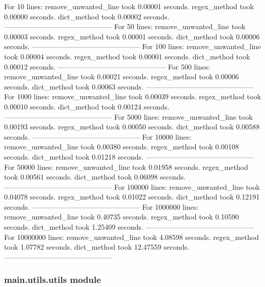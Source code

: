 \documentclass[letterpaper,10pt,english]{sphinxmanual}
\begin{document}
\begin{fulllineitems}
\pysigstopsignatures
\sphinxAtStartPar
For 10 lines:
remove\_unwanted\_line took 0.00001 seconds.
regex\_method took 0.00000 seconds.
dict\_method took 0.00002 seconds.
———————————————
For 50 lines:
remove\_unwanted\_line took 0.00003 seconds.
regex\_method took 0.00001 seconds.
dict\_method took 0.00006 seconds.
———————————————
For 100 lines:
remove\_unwanted\_line took 0.00004 seconds.
regex\_method took 0.00001 seconds.
dict\_method took 0.00012 seconds.
———————————————
For 500 lines:
remove\_unwanted\_line took 0.00021 seconds.
regex\_method took 0.00006 seconds.
dict\_method took 0.00063 seconds.
———————————————
For 1000 lines:
remove\_unwanted\_line took 0.00039 seconds.
regex\_method took 0.00010 seconds.
dict\_method took 0.00124 seconds.
———————————————
For 5000 lines:
remove\_unwanted\_line took 0.00193 seconds.
regex\_method took 0.00050 seconds.
dict\_method took 0.00588 seconds.
———————————————
For 10000 lines:
remove\_unwanted\_line took 0.00380 seconds.
regex\_method took 0.00108 seconds.
dict\_method took 0.01218 seconds.
———————————————
For 50000 lines:
remove\_unwanted\_line took 0.01958 seconds.
regex\_method took 0.00561 seconds.
dict\_method took 0.06098 seconds.
———————————————
For 100000 lines:
remove\_unwanted\_line took 0.04078 seconds.
regex\_method took 0.01022 seconds.
dict\_method took 0.12191 seconds.
———————————————
For 1000000 lines:
remove\_unwanted\_line took 0.40735 seconds.
regex\_method took 0.10590 seconds.
dict\_method took 1.25409 seconds.
———————————————
For 10000000 lines:
remove\_unwanted\_line took 4.08598 seconds.
regex\_method took 1.07782 seconds.
dict\_method took 12.47559 seconds.
———————————————

\end{fulllineitems}



\subsubsection{main.utils.utils module}
\label{\detokenize{main.utils:module-main.utils.utils}}\label{\detokenize{main.utils:main-utils-utils-module}}
\end{document}
